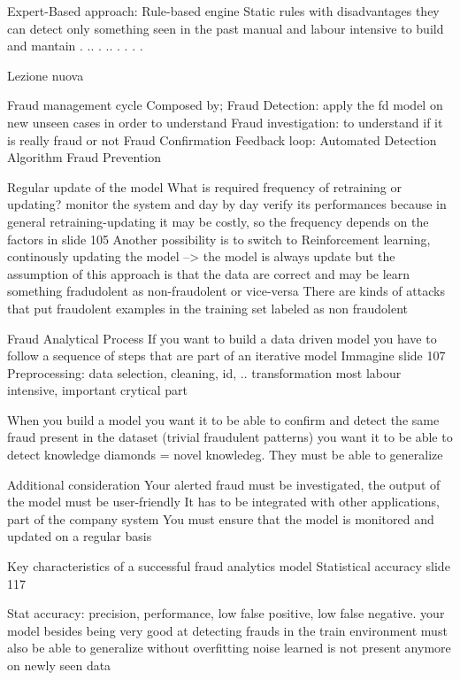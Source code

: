 Expert-Based approach:
    Rule-based engine
        Static rules with disadvantages
            they can detect only something seen in the past
            manual and labour intensive to build and mantain
.
..
.
..
.
.
.
.


Lezione nuova 

Fraud management cycle
    Composed by;
        Fraud Detection: apply the fd model on new unseen cases in order to understand 
        Fraud investigation: to understand if it is really fraud or not 
        Fraud Confirmation 
        Feedback loop: Automated Detection Algorithm 
        Fraud Prevention 

Regular update of the model 
    What is required frequency of retraining or updating?
        monitor the system and day by day verify its performances 
        because in general retraining-updating it may be costly, so the frequency depends on the factors in slide 105
        Another possibility is to switch to Reinforcement learning, continously updating the model --> the model is always update
            but the assumption of this approach is that the data are correct and may be learn something fradudolent as non-fraudolent or vice-versa
            There are kinds of attacks that put fraudolent examples in the training set labeled as non fraudolent 

Fraud Analytical Process 
    If you want to build a data driven model you have to follow a sequence of steps that are part of an iterative model 
    Immagine slide 107
    Preprocessing: data selection, cleaning, id, .. transformation most labour intensive, important crytical part 

When you build a model 
    you want it to be able to confirm and detect the same fraud present in the dataset (trivial fraudulent patterns)
    you want it to be able to detect knowledge diamonds = novel knowledeg. They must be able to generalize 

Additional consideration 
    Your alerted fraud must be investigated, the output of the model must be user-friendly 
    It has to be integrated with other applications, part of the company system 
    You must ensure that the model is monitored and updated on a regular basis

Key characteristics of a successful fraud analytics model 
    Statistical accuracy
    slide 117

Stat accuracy:  precision, performance, low false positive, low false negative.
                your model besides being very good at detecting frauds in the train environment 
                must also be able to generalize without overfitting
                noise learned is not present anymore on newly seen data 

